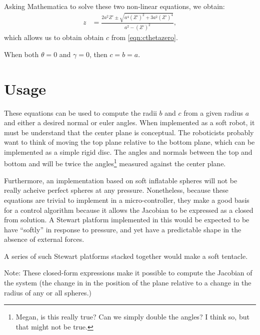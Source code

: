 \documentclass{article}
\begin{document}
Asking Mathematica to solve these two non-linear equations, we obtain:
\begin{align}
 z &=  \frac{2 a^2 Z' \pm \sqrt{a^4 (Z')^2 + 3 a^2 (Z')^4}}{a^2 - (Z')^2},
\end{align}
which allows us to obtain obtain $c$ from \ref{eqn:cthetazero}.

When both $\theta = 0$ and $\gamma = 0$, then $c = b = a$.

\section{Usage}

These equations can be used to compute the radii $b$ and $c$
from a given radius $a$ and either a desired normal or euler
angles. When implemented as a soft robot, it must be understand
that the center plane is conceptual. The roboticists probably
want to think of moving the top plane relative to the bottom plane,
which can be implemented as a simple rigid disc.
The angles and normals between the top and bottom and will be
twice the angles\footnote{Megan, is this really true? Can we simply double the angles? I think so, but that might not be true.} measured against the center plane.

Furthermore, an implementation based on soft inflatable spheres
will not be really acheive perfect spheres at any pressure.
Nonetheless, because these equations are trivial to implement
in a micro-controller, they make a good basis for a control
algorithm because it allows the Jacobian to be expressed as a
closed from solution. A Stewart platform implemented in this would
be expected to be have ``softly'' in response to pressure,
and yet have a predictable shape in the absence of external
forces.

A series of such Stewart platforms stacked together would make
a soft tentacle.

Note: These closed-form expressions make it possible to compute the Jacobian of the system (the change in in the position
of the plane relative to a change in the radius of any or all spheres.)

\printbibliography
\end{document}
